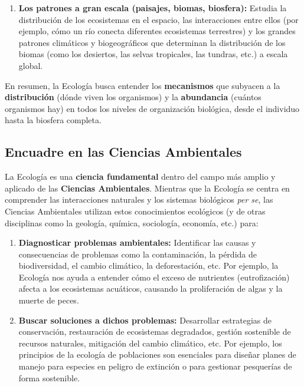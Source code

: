 \documentclass[
]{book}
\begin{document}
\begin{enumerate}
\item
  \textbf{Los patrones a gran escala (paisajes, biomas, biosfera):} Estudia la distribución de los ecosistemas en el espacio, las interacciones entre ellos (por ejemplo, cómo un río conecta diferentes ecosistemas terrestres) y los grandes patrones climáticos y biogeográficos que determinan la distribución de los biomas (como los desiertos, las selvas tropicales, las tundras, etc.) a escala global.
\end{enumerate}

En resumen, la Ecología busca entender los \textbf{mecanismos} que subyacen a la \textbf{distribución} (dónde viven los organismos) y la \textbf{abundancia} (cuántos organismos hay) en todos los niveles de organización biológica, desde el individuo hasta la biosfera completa.

\subsection*{\texorpdfstring{\textbf{Encuadre en las Ciencias Ambientales}}{Encuadre en las Ciencias Ambientales}}\label{ccaa}

La Ecología es una \textbf{ciencia fundamental} dentro del campo más amplio y aplicado de las \textbf{Ciencias Ambientales}. Mientras que la Ecología se centra en comprender las interacciones naturales y los sistemas biológicos \emph{per se}, las Ciencias Ambientales utilizan estos conocimientos ecológicos (y de otras disciplinas como la geología, química, sociología, economía, etc.) para:

\begin{enumerate}
\def\labelenumi{\arabic{enumi}.}
\item
  \textbf{Diagnosticar problemas ambientales:} Identificar las causas y consecuencias de problemas como la contaminación, la pérdida de biodiversidad, el cambio climático, la deforestación, etc. Por ejemplo, la Ecología nos ayuda a entender cómo el exceso de nutrientes (eutrofización) afecta a los ecosistemas acuáticos, causando la proliferación de algas y la muerte de peces.
\item
  \textbf{Buscar soluciones a dichos problemas:} Desarrollar estrategias de conservación, restauración de ecosistemas degradados, gestión sostenible de recursos naturales, mitigación del cambio climático, etc. Por ejemplo, los principios de la ecología de poblaciones son esenciales para diseñar planes de manejo para especies en peligro de extinción o para gestionar pesquerías de forma sostenible.
\end{enumerate}
\end{document}
